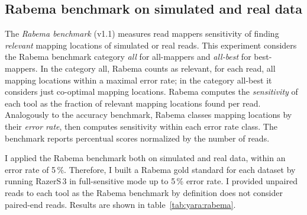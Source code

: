 \subsection{Rabema benchmark on simulated and real data}

The \emph{Rabema benchmark} \citep{Holtgrewe2011} (v1.1) measures read mappers sensitivity of finding \emph{relevant} mapping locations of simulated or real reads.
This experiment considers the Rabema benchmark category \emph{all} for all-mappers and \emph{all-best} for best-mappers.
In the category all, Rabema counts as relevant, for each read, all mapping locations within a maximal error rate; in the category all-best it considers just co-optimal mapping locations.
Rabema computes the \emph{sensitivity} of each tool as the fraction of relevant mapping locations found per read.
Analogously to the accuracy benchmark, Rabema classes mapping locations by their \emph{error rate}, then computes sensitivity within each error rate class.
The benchmark reports percentual scores normalized by the number of reads.

I applied the Rabema benchmark both on simulated and real data, within an error rate of 5\,\%.
Therefore, I built a Rabema gold standard for each dataset by running RazerS\,3 in full-sensitive mode up to 5\,\% error rate.
I provided unpaired reads to each tool as the Rabema benchmark by definition does not consider paired-end reads.
Results are shown in table~\ref{tab:yara:rabema}.



\begin{table*}[t]
  \caption[Yara results in the Rabema benchmark]
  {
  \label{tab:yara:rabema}
    Rabema benchmark results on the human whole genome.
    The left panel shows the results of mapping $1\,\text{M}$ Illumina-like $2 \times 100\,\text{bp}$ simulated reads; the right panel shows the results of mapping $1\,\text{M}$ Illumina $2 \times 100\,\text{bp}$ real reads.
    Big numbers show total Rabema scores, while small numbers show marginal scores for the mapping locations at
    $\bigl(\begin{smallmatrix}\mbox{\tiny 0}&\mbox{\tiny 1}&\mbox{\tiny 2}\\\mbox{\tiny 3}&\mbox{\tiny 4}&\mbox{\tiny 5}\end{smallmatrix}\bigr)$ \% error rate.
    }
  \vspace{-3mm}
  \center
  \sffamily
  \resizebox{0.95\textwidth}{!}
  {
	\renewcommand{\tabcolsep}{0.8ex}
	
  }
\end{table*}


